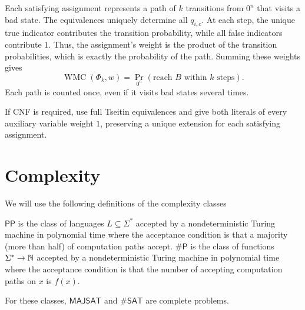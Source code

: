 \documentclass[acmsmall,screen,review,anonymous,nonacm]{PLDI/acmart}
\begin{document}
Each satisfying assignment represents a path of \(k\) transitions
from \(0^n\) that visits a bad state.
The equivalences uniquely determine all \(q_{i,c}\).
At each step, the unique true indicator contributes the transition
probability, while all false indicators contribute \(1\).
Thus, the assignment's weight is the product of the transition
probabilities, which is exactly the probability of the path.
Summing these weights gives
\[
\operatorname{WMC}(\Phi_k,w)
=
\Pr_{0^n}\!\left(\text{reach }B\text{ within }k\text{ steps}\right).
\]
Each path is counted once, even if it visits bad states several times.

If CNF is required, use full Tseitin equivalences and give both
literals of every auxiliary variable weight \(1\), preserving a
unique extension for each satisfying assignment.



\section{Complexity}

We will use the following definitions of the complexity classes

\begin{definition}
    $\mathsf{PP}$ is the class of languages $L\subseteq \Sigma^*$ accepted by a nondeterministic Turing machine in polynomial time where the acceptance condition is that a majority (more than half) of computation paths accept.
    $\mathsf{\#P}$ is the class of functions $\Sigma^*\to {{ \mathbb{N}}}$ accepted by a nondeterministic Turing machine in polynomial time where the acceptance condition is that the number of accepting computation paths on $x$ is $f(x)$.
\end{definition}

For these classes, $\mathsf{MAJSAT}$ and $\mathsf{\#SAT}$ are complete problems.
\end{document}
